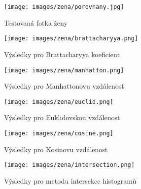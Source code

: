 \documentclass{report}
\begin{document}
	\begin{figure}[ht]
	    \texttt{[image: images/zena/porovnany.jpg]}
	    \caption{Testovaná fotka ženy}
	    \label{fig:LandscapeFigure}
	\end{figure}

  \begin{landscape}
    \begin{figure}
	    \texttt{[image: images/zena/brattacharyya.png]}
	    \caption{Výsledky pro Brattacharyya koeficient}
	    \label{fig:LandscapeFigure}
	\end{figure}
	\begin{figure}
	    \texttt{[image: images/zena/manhatton.png]}
	    \caption{Výsledky pro Manhattonovu vzdálenost}
	    \label{fig:LandscapeFigure}
	\end{figure}

	\begin{figure}
	    \texttt{[image: images/zena/euclid.png]}
	    \caption{Výsledky pro Euklidovskou vzdálenost}
	    \label{fig:LandscapeFigure}
	\end{figure}

	\begin{figure}
	    \texttt{[image: images/zena/cosine.png]}
	    \caption{Výsledky pro Kosinovu vzdálenost}
	    \label{fig:LandscapeFigure}
	\end{figure}

	\begin{figure}
	    \texttt{[image: images/zena/intersection.png]}
	    \caption{Výsledky pro metodu intersekce histogramů}
	    \label{fig:LandscapeFigure}
	\end{figure}

  \end{landscape}
\end{document}

